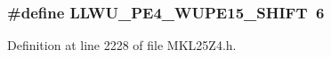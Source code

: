 \subsubsection[{\texorpdfstring{L\+L\+W\+U\+\_\+\+P\+E4\+\_\+\+W\+U\+P\+E15\+\_\+\+S\+H\+I\+FT}{LLWU_PE4_WUPE15_SHIFT}}]{\setlength{\rightskip}{0pt plus 5cm}\#define L\+L\+W\+U\+\_\+\+P\+E4\+\_\+\+W\+U\+P\+E15\+\_\+\+S\+H\+I\+FT~6}\hypertarget{group___l_l_w_u___register___masks_gaeaf1e05b8de75133c46d6f11b3346732}{}\label{group___l_l_w_u___register___masks_gaeaf1e05b8de75133c46d6f11b3346732}


Definition at line 2228 of file M\+K\+L25\+Z4.\+h.

